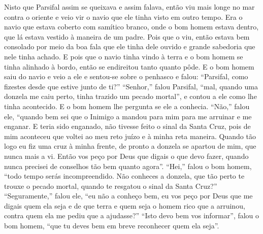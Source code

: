 Nisto que Parsifal assim se queixava e assim falava, então viu mais longe
no mar contra o oriente e veio vir o navio que ele tinha visto em outro tempo.
Era o navio que estava coberto com samítico branco, onde o bom homem estava
dentro, que lá estava vestido à maneira de um padre. Pois que o viu, então
estava bem consolado por meio da boa fala que ele tinha dele ouvido e grande
sabedoria que nele tinha achado. E pois que o navio tinha vindo à terra e o bom
homem se tinha alinhado à bordo, então se endireitou tanto quanto pôde. E o bom
homem saiu do navio e veio a ele e sentou-se sobre o penhasco e falou:
“Parsifal, como fizestes desde que estive junto de ti?” “Senhor,” falou
Parsifal, “mal, quando uma donzela me caiu perto, tinha trazido um pecado
mortal”, e contou a ele como lhe tinha acontecido. E o bom homem lhe pergunta
se ele a conhecia. “Não,” falou ele, “quando bem sei que o Inimigo a mandou
para mim para me arruinar e me enganar. E teria sido enganado, não tivesse
feito o sinal da Santa Cruz, pois de mim aconteceu que voltei ao meu reto juízo
e à minha reta maneira. Quando tão logo eu fiz uma cruz à minha frente, de
pronto a donzela se apartou de mim, que nunca mais a vi. Então vos peço por
Deus que digais o que devo fazer, quando nunca precisei de conselhos tão bem
quanto agora”. “Hei,” falou o bom homem, “todo tempo serás
incompreendido. Não conheces a donzela, que tão perto te trouxe o pecado
mortal, quando te resgatou o sinal da Santa Cruz?” “Seguramente,” falou ele,
“eu não a conheço bem, eu vos peço por Deus que me digais quem ela seja e de
que terra e quem seja o homem rico que a arruinou, contra quem ela me pediu que
a ajudasse?” “Isto devo bem vos informar”, falou o bom homem, “que tu
deves bem em breve reconhecer quem ela seja”.

